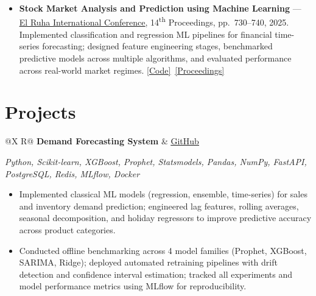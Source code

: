 \documentclass[a4paper,10pt]{article}
\newcommand{\ulink}[2]{\href{#1}{\uline{#2}}}
\newcommand{\subheading}[1]{{\color[HTML]{0A0A0A}\fontsize{12}{14}\selectfont\bfseries #1}}
\newcommand{\techstack}[1]{{\color[HTML]{5C5C5C}\fontsize{10.5}{12.5}\selectfont\itshape #1}}
\newcommand{\meta}[1]{{\color[HTML]{5C5C5C}\fontsize{10.5}{12.5}\selectfont #1}}
\begin{document}
\begin{itemize}[nosep, leftmargin=1.5em, itemsep=1pt, topsep=1pt]
\item {\color[HTML]{0A0A0A}\fontsize{11}{14}\selectfont
\textbf{Stock Market Analysis and Prediction using Machine Learning} ---
\ulink{https://www.elruha.org/_files/ugd/614b1f_6b95e1b697bf452b9907ba46e0151c05.pdf\#page=774}{El Ruha International Conference}, 14\textsuperscript{th} Proceedings, pp.\ 730--740, 2025.
Implemented classification and regression ML pipelines for financial time-series forecasting; designed feature engineering stages, benchmarked predictive models across multiple algorithms, and evaluated performance across real-world market regimes.
\ulink{https://github.com/su-jin1425/Set-Project}{[Code]}\ \ulink{https://www.elruha.org/congress-books}{[Proceedings]}}
\end{itemize}

\vspace{2pt}

\section{Projects}
\vspace{2pt}

\begin{tabularx}{\linewidth}{@{}X R@{}}
\subheading{Demand Forecasting System} & \meta{\ulink{https://github.com/su-jin1425/Demand-Forecasting-System}{GitHub}}
\end{tabularx}
\vspace{1pt}
\techstack{Python, Scikit-learn, XGBoost, Prophet, Statsmodels, Pandas, NumPy, FastAPI, PostgreSQL, Redis, MLflow, Docker}
\begin{itemize}[nosep, leftmargin=1.5em, itemsep=1pt, topsep=2pt]
\item {\color[HTML]{0A0A0A}\fontsize{11}{14}\selectfont
Implemented classical ML models (regression, ensemble, time-series) for sales and inventory demand prediction; engineered lag features, rolling averages, seasonal decomposition, and holiday regressors to improve predictive accuracy across product categories.}
\item {\color[HTML]{0A0A0A}\fontsize{11}{14}\selectfont
Conducted offline benchmarking across 4 model families (Prophet, XGBoost, SARIMA, Ridge); deployed automated retraining pipelines with drift detection and confidence interval estimation; tracked all experiments and model performance metrics using MLflow for reproducibility.}
\end{itemize}
\end{document}
